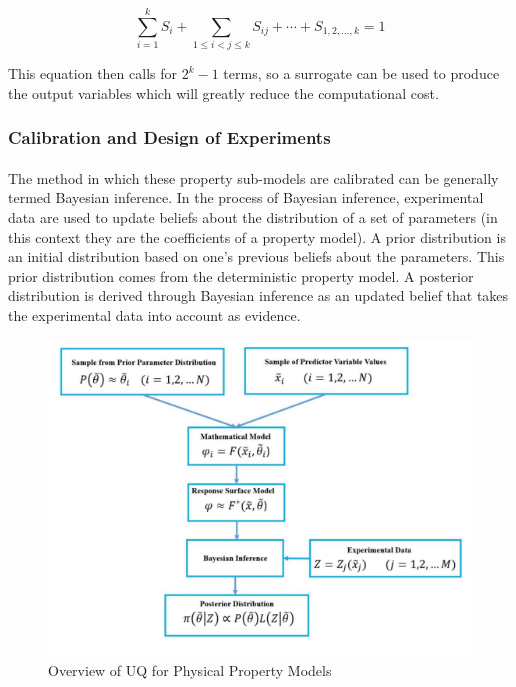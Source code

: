 \documentclass[12pt, letterpaper]{article}
\begin{document}
\begin{equation}
    \sum_{i=1}^k S_i+\sum_{1 \leq i<j \leq k} S_{i j}+\cdots+S_{1,2, \ldots, k}=1
\end{equation}

This equation then calls for $2^k - 1$ terms, so a surrogate can be used to produce the output variables which will greatly reduce the computational cost.

\subsubsection{Calibration and Design of Experiments}
\paragraph{}
The method in which these property sub-models are calibrated can be generally termed Bayesian inference. In the process of Bayesian inference, experimental data are used to update beliefs about the distribution of a set of parameters (in this context they are the coefficients of a property model). A prior distribution is an initial distribution based on one's previous beliefs about the parameters. This prior distribution comes from the deterministic property model. A posterior distribution is derived through Bayesian inference as an updated belief that takes the experimental data into account as evidence. 

\begin{figure}[ht]
    \centering
    \includegraphics[width=16cm]{Bayesian Inference.png}
    \caption{Overview of UQ for Physical Property Models}
\end{figure}
\end{document}
